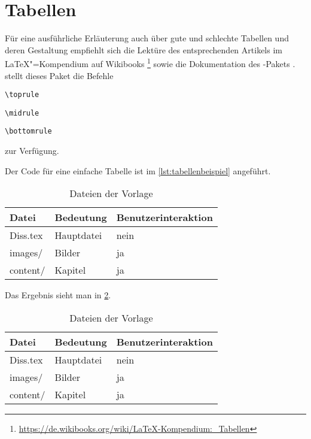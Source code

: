 \section{Tabellen}%
\label{sec:Tabellen}
Für eine ausführliche Erläuterung auch über gute und schlechte Tabellen
und deren Gestaltung empfiehlt sich die Lektüre des entsprechenden Artikels im \LaTeX{}"=Kompendium auf Wikibooks%
\footnote{\url{https://de.wikibooks.org/wiki/LaTeX-Kompendium:_Tabellen}}
sowie die Dokumentation des -Pakets \cite{Fear2005}.
\Ua stellt dieses Paket die Befehle
\begin{itemize*}
	\item \lstinline|\toprule|
	\item \lstinline|\midrule|
	\item \lstinline|\bottomrule|
\end{itemize*}
zur Verfügung.

Der Code für eine einfache Tabelle ist im \cref{lst:tabellenbeispiel} angeführt.

\begin{latex}[caption={Einfache Tabelle in \LaTeX},label={lst:tabellenbeispiel}]
\begin{table}%
	\centering%
	\begin{tabularx}{\columnwidth}{l l X}%
		\toprule%
		Datei       &  Bedeutung    &  Benutzerinteraktion \\%
		\midrule%
		Diss.tex  &  Hauptdatei   &  nein     \\%
		images/   &  Bilder       &  ja       \\%
		content/  &  Kapitel      &  ja       \\%
		\bottomrule%
	\end{tabularx}%
	\caption{Dateien der Vorlage}%
	\label{tab:tabellenbeispiel}%
\end{table}
\end{latex}

Das Ergebnis sieht man in \cref{tab:tabellenbeispiel}.

\begin{table}%
	\centering%
	\begin{tabular}{l l l}%
		\toprule%
		Datei       &  Bedeutung    &  Benutzerinteraktion \\%
		\midrule%
		Diss.tex  &  Hauptdatei   &  nein     \\%
		images/   &  Bilder       &  ja       \\%
		content/  &  Kapitel      &  ja       \\%
		\bottomrule%
	\end{tabular}%
	\caption{Dateien der Vorlage}%
	\label{tab:tabellenbeispiel}%
\end{table}

